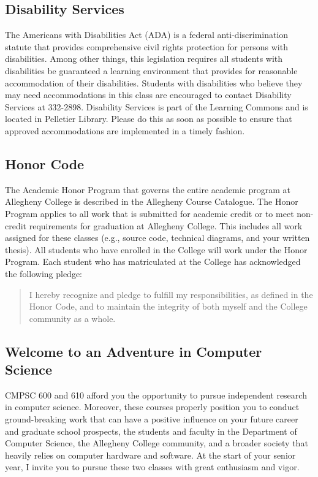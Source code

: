 \subsection*{Disability Services}

The Americans with Disabilities Act (ADA) is a federal anti-discrimination statute that provides comprehensive civil
rights protection for persons with disabilities.  Among other things, this legislation requires all students with
disabilities be guaranteed a learning environment that provides for reasonable accommodation of their disabilities.
Students with disabilities who believe they may need accommodations in this class are encouraged to contact Disability
Services at 332-2898.  Disability Services is part of the Learning Commons and is located in Pelletier Library.
Please do this as soon as possible to ensure that approved accommodations are implemented in a timely fashion.

\subsection*{Honor Code}

The Academic Honor Program that governs the entire academic program at Allegheny College is described in the Allegheny
Course Catalogue.  The Honor Program applies to all work that is submitted for academic credit or to meet non-credit
requirements for graduation at Allegheny College.  This includes all work assigned for these classes (e.g., source code,
technical diagrams, and your written thesis).  All students who have enrolled in the College will work under the Honor
Program.  Each student who has matriculated at the College has acknowledged the following pledge:

\vspace*{-.1in}
\begin{quote}
I hereby recognize and pledge to fulfill my responsibilities, as defined in the Honor Code, and to maintain the
integrity of both myself and the College community as a whole.
\end{quote}
\vspace*{-.15in}

\subsection*{Welcome to an Adventure in Computer Science}

CMPSC 600 and 610 afford you the opportunity to pursue independent research in computer science.  Moreover, these
courses properly position you to conduct ground-breaking work that can have a positive influence on your future career
and graduate school prospects, the students and faculty in the Department of Computer Science, the Allegheny College
community, and a broader society that heavily relies on computer hardware and software.  At the start of your senior
year, I invite you to pursue these two classes with great enthusiasm and vigor.

